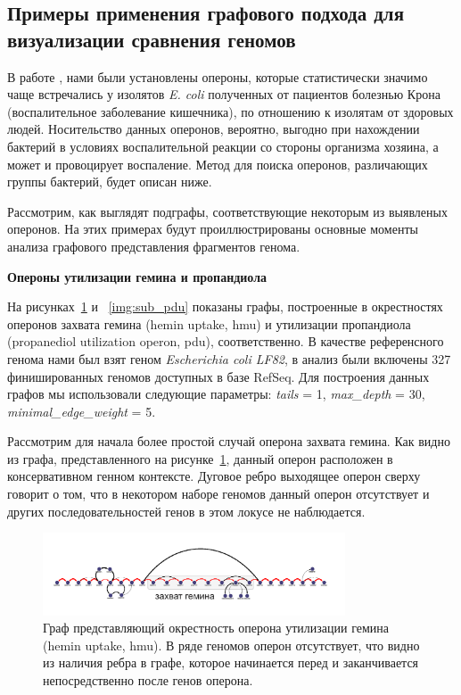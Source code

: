 \subsection*{Примеры применения графового подхода для визуализации сравнения геномов}

В работе \cite{rakitina2017genome}, нами были установлены опероны, которые статистически значимо чаще встречались у изолятов \textit{E. coli} полученных от пациентов болезнью Крона (воспалительное заболевание кишечника), по отношению к изолятам от здоровых людей. Носительство данных оперонов, вероятно, выгодно при нахождении бактерий в условиях воспалительной реакции со стороны организма хозяина, а может и провоцирует воспаление. Метод для поиска оперонов, различающих группы бактерий, будет описан ниже.

Рассмотрим, как выглядят подграфы, соответствующие некоторым из выявленых оперонов. На этих примерах будут проиллюстрированы основные моменты анализа графового представления фрагментов генома. 

\textbf{Опероны утилизации гемина и пропандиола}

На рисунках~\ref{img:sub_hem} и ~\ref{img:sub_pdu} показаны графы, построенные в окрестностях оперонов захвата гемина (hemin uptake, hmu) и утилизации пропандиола (propanediol utilization operon, pdu), соответственно. В качестве референсного генома нами был взят геном \textit{Escherichia coli LF82}, в анализ были включены 327 финишированных геномов доступных в базе RefSeq. Для построения данных графов мы использовали следующие параметры: \textit{tails} = 1, \textit{max\_depth} = 30, \textit{minimal\_edge\_weight} = 5. 

Рассмотрим для начала более простой случай оперона захвата гемина. Как видно из графа, представленного на рисунке~\ref{img:sub_hem}, данный оперон расположен в консервативном генном контексте. Дуговое ребро выходящее оперон сверху говорит о том, что в некотором наборе геномов данный оперон отсутствует и других последовательностей генов в этом локусе не наблюдается. 

\begin{figure}[!ht] 
  \center
  \includegraphics[width=0.8\textwidth]{Dissertation/images/subgraphs/hemin.png}
  \caption{Граф представляющий окрестность оперона утилизации гемина (hemin uptake, hmu). В ряде геномов оперон отсутствует, что видно из наличия ребра в графе, которое начинается перед и заканчивается непосредственно после генов оперона. }
  \label{img:sub_hem} 
\end{figure}

